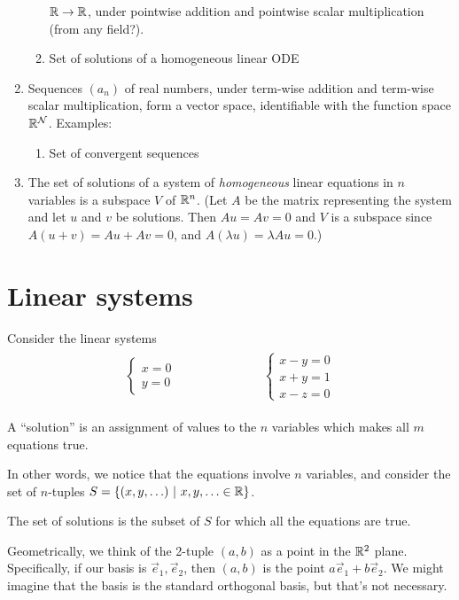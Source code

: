 \begin{enumerate}
\begin{enumerate}
    $\mathbb{R} \to \mathbb{R}$, under pointwise addition and pointwise scalar multiplication
    (from any field?).
  \item Set of solutions of a homogeneous linear ODE
  \end{enumerate}
\item Sequences $(a_n)$ of real numbers, under term-wise addition and term-wise
  scalar multiplication, form a vector space, identifiable with the function
  space $\mathbb{R}^{\mathcal{N}}$. Examples:
  \begin{enumerate}
  \item Set of convergent sequences
  \end{enumerate}
\item The set of solutions of a system of \textit{homogeneous} linear equations
  in $n$ variables is a subspace $V$ of $\mathbb{R}^n$. (Let $A$ be the matrix
  representing the system and let $u$ and $v$ be solutions. Then $Au = Av = 0$
  and $V$ is a subspace since $A(u + v) = Au + Av = 0$, and
  $A(\lambda u) = \lambda Au = 0$.)
\end{enumerate}

\section{Linear systems}

Consider the linear systems
\begin{align*}
  \begin{array}{cc}
    \begin{cases}
      x = 0\\
      y = 0
    \end{cases}
    ~~~~~~~~~~~~~~~~~~~~~~~~~~~~&
    \begin{cases}
      x - y = 0\\
      x + y = 1\\
      x - z = 0
    \end{cases}
  \end{array}
\end{align*}

A ``solution'' is an assignment of values to the $n$ variables which makes all
$m$ equations true.

In other words, we notice that the equations involve $n$ variables, and
consider the set of $n$-tuples
$S = \{(x, y, \ldots) ~|~ x, y, \ldots \in \mathbb{R}\}$.

The set of solutions is the subset of $S$ for which all the equations are true.

Geometrically, we think of the 2-tuple $(a, b)$ as a point in the $\mathbb{R}^2$
plane. Specifically, if our basis is $\vec e_1, \vec e_2$, then $(a, b)$ is the
point $a\vec e_1 + b\vec e_2$. We might imagine that the basis is the standard
orthogonal basis, but that's not necessary.

